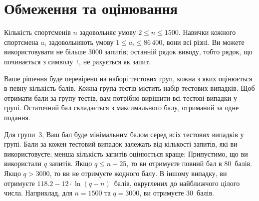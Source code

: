 \section*{Обмеження та оцінювання}

Кількість спортсменів $n$ задовольняє умову
$2\leq n\leq 1500$. %
Навички кожного спортсмена $a_i$ задовольняють умову
$1\leq a_i\leq 86\,400$, %
вони всі різні. %
Ви можете використовувати
не більше 3000 запитів; %
останній рядок виводу, тобто рядок, що починається з символу \texttt{!}, не рахується як запит.

Ваше рішення буде перевірено на наборі тестових груп, кожна з яких оцінюється в певну кількість балів.
Кожна група тестів містить набір тестових випадків.
Щоб отримати бали за групу тестів, вам потрібно вирішити всі тестові випадки у групі.
Остаточний бал складається з максимального балу, отриманий за одне подання.

Для групи~$3$, Ваш бал буде мінімальним балом серед всіх тестових випадків у групі.
Бали за кожен тестовий випадок залежать від кількості запитів, які ви використовуєте;
менша кількість запитів оцінюється краще:
Припустимо, що ви використали $q$ запитів.
Якщо $q \le n+25$, то ви отримуєте повний бал в $80$~балів.
Якщо $q > 3000$, то ви не отримуєте жодного балу.
В іншому випадку, ви отримуєте
$118.2 - 12 \cdot \ln(q - n)$~балів, округлених до найближчого цілого числа. %
Наприклад, для $n = 1500$ та $q = 3000$, ви отримуєте $30$~балів.

